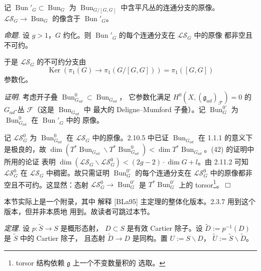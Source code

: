  记 $\operatorname{Bun}'_G\subset\operatorname{Bun}_G$
为 $\operatorname{Bun}_{G/[G,G]}$ 中含平凡丛的连通分支的原像。
$\mathcal{LS}_G\to\operatorname{Bun}_G$ 的像含于
$\operatorname{Bun}'_G$。

 \emph{命题.} 设 $g>1$，$G$ 约化。则
$\operatorname{Bun}'_G$ 的每个连通分支在 $\mathcal{LS}_G$ 中的原像
都非空且不可约。

于是 $\mathcal{LS}_G$ 的不可约分支由
\[
  \operatorname{Ker}(\pi_1(G)\to\pi_1(G/[G,G]))=\pi_1([G,G])
\]
参数化。

\emph{证明.} 考虑开子叠
$\operatorname{Bun}^0_{G_{ad}}\subset\operatorname{Bun}_{G_{ad}}$，
它参数化满足 $H^0(X,(\mathfrak{g}_{ad})_{\mathcal{F}})=0$ 的
$G_{ad}$-丛 $\mathcal{F}$（这是 $\operatorname{Bun}_{G_{ad}}$ 中
最大的 Deligne--Mumford 子叠）。记 $\operatorname{Bun}^{0\prime}_G$
为 $\operatorname{Bun}^0_{G_{ad}}$ 在 $\operatorname{Bun}'_G$ 中的
原像。


记 $\mathcal{LS}^0_G$ 为 $\operatorname{Bun}^0_{G_{ad}}$ 在
$\mathcal{LS}_G$ 中的原像。2.10.5 中已证
$\operatorname{Bun}_{G_{ad}}$ 在 1.1.1 的意义下是极良的，故
$\dim(T^{*}\operatorname{Bun}_{G_{ad}}
\backslash T^{*}\operatorname{Bun}^0_{G_{ad}})
<\dim T^{*}\operatorname{Bun}_{G_{ad}}$。(42) 的证明中所用的论证
表明 $\dim(\mathcal{LS}_G\backslash\mathcal{LS}^0_G)
<(2g-2)\cdot\dim G+l$。由 2.11.2 可知 $\mathcal{LS}^0_G$ 在
$\mathcal{LS}_G$ 中稠密。故只需证明
$\operatorname{Bun}^{0\prime}_G$ 的每个连通分支在
$\mathcal{LS}^0_G$ 中的原像都非空且不可约。这显然：态射
$\mathcal{LS}^0_G\to\operatorname{Bun}^{0\prime}_G$ 是
$T^{*}\operatorname{Bun}^{0\prime}_G$ 上的
torsor\footnote{torsor 结构依赖 $\mathfrak{g}$ 上一个不变数量积的
选取。}。\hfill$\Box$

 本节实际上是一个附录，其中
解释 [BLa95] 主定理的整体化版本。2.3.7 用到这个版本，但并非本质地
用到。故读者可跳过本节。

 \emph{定理.} 设 $p:\widetilde{S}\to S$ 是概形态射，
$D\subset S$ 是有效 Cartier 除子。设
$\widetilde{D}:=p^{-1}(D)$ 是 $\widetilde{S}$ 中的 Cartier 除子，
且态射 $\widetilde{D}\to D$ 是同构。置 $U:=S\backslash D$，
$\widetilde{U}:=\widetilde{S}\backslash\widetilde{D}$。

